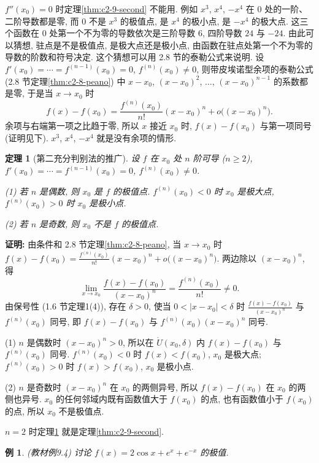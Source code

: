 \documentclass[UTF8,openany]{ctexbook}
\theoremstyle{chinesetextbook}
\newtheorem{example}{例}[section]
\newtheorem{theorem}{定理}[section]
\newenvironment{cnproof}{\par\indent\textbf{证明:} \ignorespaces}{\par}
\begin{document}
$f''(x_0)=0$ 时定理\ref{thm:c2-9-second} 不能用. 例如 $x^3$, $x^4$, $-x^4$ 在 $0$ 处的一阶、二阶导数都是零, 而 $0$ 不是 $x^3$ 的极值点, 是 $x^4$ 的极小点, 是 $-x^4$ 的极大点. 这三个函数在 $0$ 处第一个不为零的导数依次是三阶导数 $6$, 四阶导数 $24$ 与 $-24$. 由此可以猜想, 驻点是不是极值点, 是极大点还是极小点, 由函数在驻点处第一个不为零的导数的阶数和符号决定. 这个猜想可以用 2.8 节的泰勒公式来说明. 设 $f'(x_0)=\cdots=f^{(n-1)}(x_0)=0$, $f^{(n)}(x_0)\ne0$, 则带皮埃诺型余项的泰勒公式 (2.8 节定理\ref{thm:c2-8-peano}) 中 $x-x_0$, $(x-x_0)^2$, $\ldots$, $(x-x_0)^{n-1}$ 的系数都是零, 于是当 $x\to x_0$ 时
\[
f(x)-f(x_0)=\frac{f^{(n)}(x_0)}{n!}(x-x_0)^n+o\bigl((x-x_0)^n\bigr).
\]
余项与右端第一项之比趋于零, 所以 $x$ 接近 $x_0$ 时, $f(x)-f(x_0)$ 与第一项同号 (证明见下). $x^3$, $x^4$, $-x^4$ 就是没有余项的情形.
\begin{theorem}[第二充分判别法的推广]\label{thm:c2-9-higher}
设 $f$ 在 $x_0$ 处 $n$ 阶可导 ($n\ge2$), $f'(x_0)=\cdots=f^{(n-1)}(x_0)=0$, $f^{(n)}(x_0)\ne0$.

\textup{(1)} 若 $n$ 是偶数, 则 $x_0$ 是 $f$ 的极值点. $f^{(n)}(x_0)<0$ 时 $x_0$ 是极大点, $f^{(n)}(x_0)>0$ 时 $x_0$ 是极小点.

\textup{(2)} 若 $n$ 是奇数, 则 $x_0$ 不是 $f$ 的极值点.
\end{theorem}
\begin{cnproof}
由条件和 2.8 节定理\ref{thm:c2-8-peano}, 当 $x\to x_0$ 时 $\displaystyle f(x)-f(x_0)=\frac{f^{(n)}(x_0)}{n!}(x-x_0)^n+o\bigl((x-x_0)^n\bigr)$. 两边除以 $(x-x_0)^n$, 得
\[
\lim_{x\to x_0}\frac{f(x)-f(x_0)}{(x-x_0)^n}=\frac{f^{(n)}(x_0)}{n!}\ne0.
\]
由保号性 (1.6 节定理1(4)), 存在 $\delta>0$, 使当 $0<|x-x_0|<\delta$ 时 $\displaystyle\frac{f(x)-f(x_0)}{(x-x_0)^n}$ 与 $f^{(n)}(x_0)$ 同号, 即 $f(x)-f(x_0)$ 与 $f^{(n)}(x_0)(x-x_0)^n$ 同号.

(1) $n$ 是偶数时 $(x-x_0)^n>0$, 所以在 $\mathring U(x_0,\delta)$ 内 $f(x)-f(x_0)$ 与 $f^{(n)}(x_0)$ 同号. $f^{(n)}(x_0)<0$ 时 $f(x)<f(x_0)$, $x_0$ 是极大点; $f^{(n)}(x_0)>0$ 时 $f(x)>f(x_0)$, $x_0$ 是极小点.

(2) $n$ 是奇数时 $(x-x_0)^n$ 在 $x_0$ 的两侧异号, 所以 $f(x)-f(x_0)$ 在 $x_0$ 的两侧也异号. $x_0$ 的任何邻域内既有函数值大于 $f(x_0)$ 的点, 也有函数值小于 $f(x_0)$ 的点, 所以 $x_0$ 不是极值点.
\end{cnproof}
$n=2$ 时定理\ref{thm:c2-9-higher} 就是定理\ref{thm:c2-9-second}.
\begin{example}\label{ex:c2-9-4}
\textnormal{(教材例9.4)} 讨论 $f(x)=2\cos x+e^x+e^{-x}$ 的极值.
\end{example}
\end{document}
